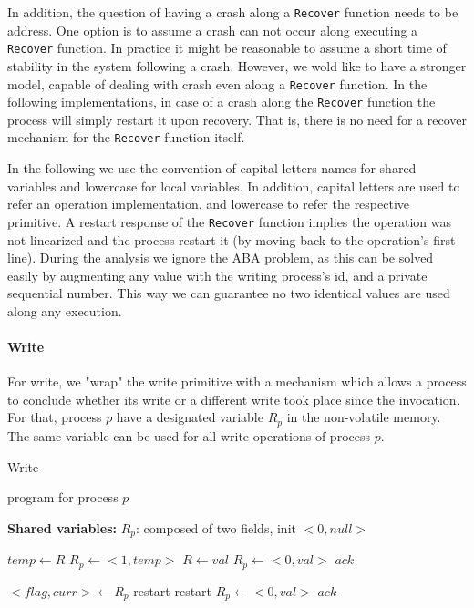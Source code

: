 In addition, the question of having a crash along a \texttt{Recover} function needs to be address. One option is to assume a crash can not occur along executing a \texttt{Recover} function. In practice it might be reasonable to assume a short time of stability in the system following a crash. However, we wold like to have a stronger model, capable of dealing with crash even along a \texttt{Recover} function. In the following implementations, in case of a crash along the \texttt{Recover} function the process will simply restart it upon recovery. That is, there is no need for a recover mechanism for the \texttt{Recover} function itself.


In the following we use the convention of capital letters names for shared variables and lowercase for local variables. In addition, capital letters are used to refer an operation implementation, and lowercase to refer the respective primitive. A restart response of the \texttt{Recover} function implies the operation was not linearized and the process restart it (by moving back to the operation's first line). During the analysis we ignore the ABA problem, as this can be solved easily by augmenting any value with the writing process's id, and a private sequential number. This way we can guarantee no two identical values are used along any execution.


\paragraph*{Write}
For write, we "wrap" the write primitive with a mechanism which allows a process to conclude whether its write or a different write took place since the invocation. For that, process $p$ have a designated variable $R_p$ in the non-volatile memory. The same variable can be used for all write operations of process $p$.

\begin{varalgorithm}{Write}
	\caption{program for process $p$}
	\label{alg:recoverable-write}
	
	\hspace*{\algorithmicindent} \textbf{Shared variables:}
	$R_p$: composed of two fields, init $<0,null>$
	
	\begin{multicols}{2}
	\begin{algorithmic}[1]	
		\State $temp \gets R$
		\State $R_p \gets <1,temp>$ \label{write-first}
		\State $R \gets val$
		\State $R_p \gets <0,val>$ \label{write-second}
		\State \Return $ack$
		\EndProcedure
		
		\columnbreak
		
		\State $<flag, curr> \gets R_p$
			\Return restart
		\EndIf
			\Return restart
		\EndIf
		\State $R_p \gets <0,val>$
		\State \Return $ack$
		\EndProcedure
	\end{algorithmic}
\end{multicols}
\end{varalgorithm}

